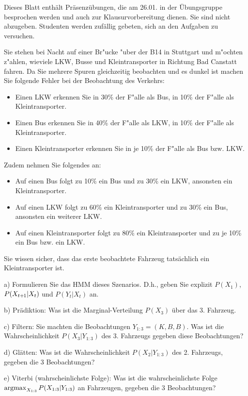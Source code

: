 

\renewcommand{\course}{Artificial Intelligence}
\renewcommand{\coursepicture}{course_ai}
\renewcommand{\coursedate}{Winter 2019}
\renewcommand{\exnum}{9}

\exercises
{}
\exercisestitle

Dieses Blatt enthält Präsenzübungen, die am 26.01. in der
Übungsgruppe besprochen werden und auch zur Klausurvorbereitung
dienen. Sie sind nicht abzugeben. Studenten werden zufällig gebeten,
sich an den Aufgaben zu versuchen.


Sie stehen bei Nacht auf einer Br"ucke "uber der B14 in Stuttgart und
m"ochten z"ahlen, wieviele LKW, Busse und Kleintransporter in Richtung
Bad Canstatt fahren. Da Sie mehrere Spuren gleichzeitig beobachten und
es dunkel ist machen Sie folgende Fehler bei der Beobachtung des Verkehrs:
\begin{itemize}
\item Einen LKW erkennen Sie in 30\% der F"alle als Bus, in 10\% der
  F"alle als Kleintransporter.
\item Einen Bus erkennen Sie in 40\% der F"alle als LKW, in 10\% der
  F"alle als Kleintransporter.
\item Einen Kleintransporter erkennen Sie in je 10\% der F"alle als
 Bus bzw. LKW.
\end{itemize}
Zudem nehmen Sie folgendes an:
\begin{itemize}
\item Auf einen Bus folgt zu 10\% ein Bus und zu 30\% ein LKW,
  ansonsten ein Kleintransporter.
\item Auf einen LKW folgt zu 60\% ein Kleintransporter und zu 30\% ein
  Bus, ansonsten ein weiterer LKW.
\item Auf einen Kleintransporter folgt zu 80\% ein Kleintransporter
  und zu je 10\% ein Bus bzw. ein LKW.
\end{itemize}
Sie wissen sicher, dass das erste beobachtete Fahrzeug tatsächlich ein
Kleintransporter ist.

a) Formulieren Sie das HMM dieses Szenarios. D.h., geben Sie explizit
$P(X_1)$, $P(X_{t{{\hspace*{-.0pt}\text{\rm +}\hspace*{-.5pt}}1}}|X_t)$ und $P(Y_t|X_t)$ an.

b) Prädiktion: Was ist die Marginal-Verteilung $P(X_3)$ über das
3. Fahrzeug.

c) Filtern: Sie machten die Beobachtungen $Y_{1:3}=(K, B,
B)$. Was ist die Wahrscheinlichkeit $P(X_3|Y_{1:3})$ des 3. Fahrzeugs
gegeben diese Beobachtungen?

d) Glätten: Was ist die Wahrscheinlichkeit $P(X_2|Y_{1:3})$ des 2. Fahrzeugs,
gegeben die 3 Beobachtungen?

e) Viterbi (wahrscheinlichste Folge): Was ist die wahrscheinlichste
Folge $\operatorname*{argmax}_{X_{1:3}} P(X_{1:3}|Y_{1:3})$ an Fahrzeugen, gegeben
  die 3 Beobachtungen?


\exerfoot
